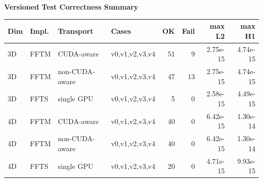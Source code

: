 \documentclass{article}
\begin{document}
\begin{center}
{\fontsize{8.0pt}{9.4pt}\selectfont
\textbf{Versioned Test Correctness Summary}

\vspace{0.6em}
\begin{tabular}{llllrrrr}
\hline
Dim & Impl. & Transport & Cases & OK & Fail & max L2 & max H1 \\
\hline
3D & FFTM & CUDA-aware & v0,v1,v2,v3,v4 & 51 & 9 & 2.75e-15 & 4.74e-15 \\
3D & FFTM & non-CUDA-aware & v0,v1,v2,v3,v4 & 47 & 13 & 2.75e-15 & 4.74e-15 \\
3D & FFTS & single GPU & v0,v1,v2,v3,v4 & 5 & 0 & 2.58e-15 & 4.49e-15 \\
4D & FFTM & CUDA-aware & v0,v1,v2,v3,v4 & 40 & 0 & 6.42e-15 & 1.30e-14 \\
4D & FFTM & non-CUDA-aware & v0,v1,v2,v3,v4 & 40 & 0 & 6.42e-15 & 1.30e-14 \\
4D & FFTS & single GPU & v0,v1,v2,v3,v4 & 20 & 0 & 4.71e-15 & 9.93e-15 \\
\hline
\end{tabular}
}
\end{center}
\end{document}
